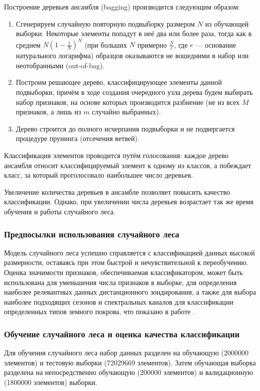 \documentclass[14pt, a4paper, oneside]{extarticle}
\begin{document}
Построение деревьев ансамбля (bagging) производится следующим образом:
\begin{enumerate}
    \item Сгенерируем случайную повторную подвыборку размером $N$ из обучающей выборки. Некоторые элементы попадут в неё два или более раза, тогда как в среднем $N(1-\frac{1}{N})^N$ (при больших $N$ примерно $\frac{N}{e}$, где $e$ --- основание натурального логарифма) образцов оказываются не вошедними в набор или неотобранными (out-of-bag).
    \item Построим решающее дерево, классифицирующее элементы данной подвыборки, причём в ходе создания очередного узла дерева будем выбирать набор признаков, на основе которых производится разбиение (не из всех $M$ признаков, а лишь из $m$ случайно выбранных).
    \item Дерево строится до полного исчерпания подвыборки и не подвергается процедуре прунинга (отсечения ветвей).
\end{enumerate}

Классификация элементов проводится путём голосования: каждое дерево ансамбля относит классифицируемый элемент к одному из классов, а побеждает класс, за который проголосовало наибольшее число деревьев.

Увеличение количества деревьев в ансамбле позволяет повысить качество классификации. Однако, при увеличении числа деревьев возрастает так же время обучения и работы случайного леса.

\subsubsection{Предпосылки использования случайного леса}
Модель случайного леса успешно справляется с классификацией данных высокой размерности, оставаясь при этом быстрой и нечувствительной к переобучению. Оценка значимости признаков, обеспечиваемая классификатором, может быть использована для уменьшения числа признаков в выборке, для определения наиболее релевантных данных дистанционного зондирования, а также для выбора наиболее подходящих сезонов и спектральных каналов для классификации определенных типов земного покрова, что показано в работе \cite{random-forest-in-remote-sensing}.

\subsubsection{Обучение случайного леса и оценка качества классификации}
Для обучения случайного леса набор данных разделен на обучающую (2000000 элементов) и тестовую выборки (72029669 элементов). Затем обучающая выборка разделена на непосредственно обучающую (200000 элементов) и валидационную (1800000 элементов) выборки.
\end{document}
